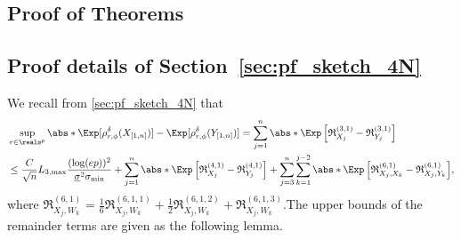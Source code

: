 \documentclass[aos]{imsart}
\begin{document}


\newpage


\begin{appendix}

\section{Proof of Theorems} \label{sec:pf_thm}




\subsection{Proof details of Section~\ref{sec:pf_sketch_4N}} \label{sec:pf_1_dep_4N}

\medskip
We recall from \cref{sec:pf_sketch_4N} that
\begin{equation} \label{eq:first_lindeberg_result_4N}
\begin{aligned}
    & \sup_{r \in \reals^p} \abs*{ \Exp[\rho_{r,\phi}^\delta(X_{[1,n]})] - \Exp[\rho_{r,\phi}^\delta(Y_{[1,n]})]} 
    = \sum_{j=1}^{n} \abs*{ \Exp \left[ 
        \mathfrak{R}_{X_j}^{(3,1)} 
        - \mathfrak{R}_{Y_j}^{(3,1)} 
    \right] }\\
    & \leq \frac{C}{\sqrt{n}} L_{3,\max} \frac{(\log(ep))^2}{\underline\sigma^2 \sigma_{\min}}
    + \sum_{j=1}^{n} \abs*{ \Exp \left[ \mathfrak{R}_{X_j}^{(4,1)} 
        - \mathfrak{R}_{Y_j}^{(4,1)} \right] }
    + \sum_{j=3}^{n} \sum_{k=1}^{j-2} \abs*{ \Exp \left[ 
        \mathfrak{R}_{X_j,X_k}^{(6,1)}
        - \mathfrak{R}_{X_j,Y_k}^{(6,1)}
    \right] },
\end{aligned}
\end{equation}
where $\mathfrak{R}_{X_j,W_k}^{(6,1)} = \frac{1}{6} \mathfrak{R}_{X_j,W_k}^{(6,1,1)} + \frac{1}{2} \mathfrak{R}_{X_j,W_k}^{(6,1,2)} + \mathfrak{R}_{X_j,W_k}^{(6,1,3)}$.The upper bounds of the remainder terms are given as the following lemma.


\end{appendix}
\end{document}
